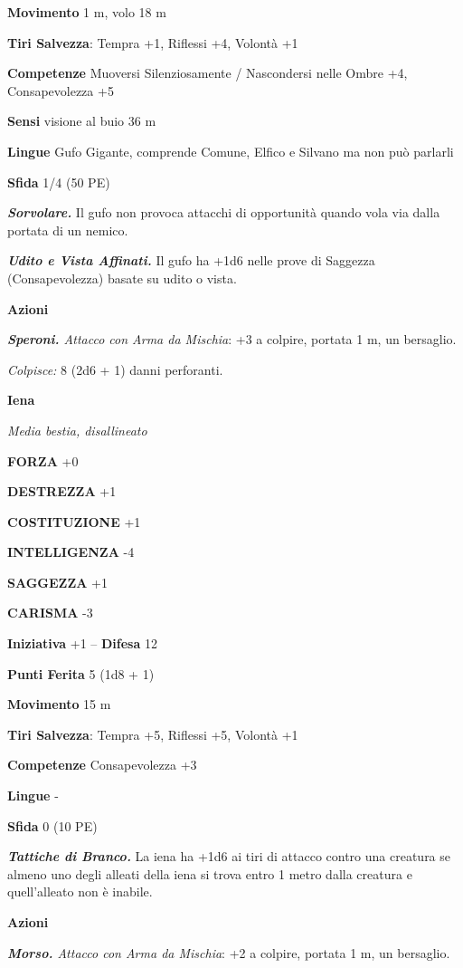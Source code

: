 \begin{multicols}{2}
\textbf{Movimento} 1 m, volo 18 m

\textbf{Tiri Salvezza}: Tempra +1, Riflessi +4, Volontà +1 

\textbf{Competenze} Muoversi Silenziosamente / Nascondersi nelle Ombre +4, Consapevolezza +5

\textbf{Sensi} visione al buio 36 m

\textbf{Lingue} Gufo Gigante, comprende Comune, Elfico e Silvano ma non può parlarli

\textbf{Sfida} 1/4 (50 PE)

\emph{\textbf{Sorvolare.}} Il gufo non provoca attacchi di opportunità quando vola via dalla portata di un nemico.

\emph{\textbf{Udito e Vista Affinati.}} Il gufo ha +1d6 nelle prove di Saggezza (Consapevolezza) basate su udito o vista.

\textbf{Azioni}

\emph{\textbf{Speroni.} Attacco con Arma da Mischia}: +3 a colpire, portata 1 m, un bersaglio.

\emph{Colpisce:} 8 (2d6 + 1) danni perforanti.

\medskip\textbf{Iena}

\emph{Media bestia, disallineato}

\textbf{FORZA} +0

\textbf{DESTREZZA} +1

\textbf{COSTITUZIONE} +1

\textbf{INTELLIGENZA} -4

\textbf{SAGGEZZA} +1

\textbf{CARISMA} -3

\textbf{Iniziativa} +1 -- \textbf{Difesa} 12

\textbf{Punti Ferita} 5 (1d8 + 1)

\textbf{Movimento} 15 m

\textbf{Tiri Salvezza}: Tempra +5, Riflessi +5, Volontà +1

\textbf{Competenze} Consapevolezza +3

\textbf{Lingue} -

\textbf{Sfida} 0 (10 PE)

\emph{\textbf{Tattiche di Branco.}} La iena ha +1d6 ai tiri di attacco contro una creatura se almeno uno degli alleati della iena si trova entro 1 metro dalla creatura e quell'alleato non è inabile.

\textbf{Azioni}

\emph{\textbf{Morso.} Attacco con Arma da Mischia}: +2 a colpire, portata 1 m, un bersaglio.


\end{multicols}
